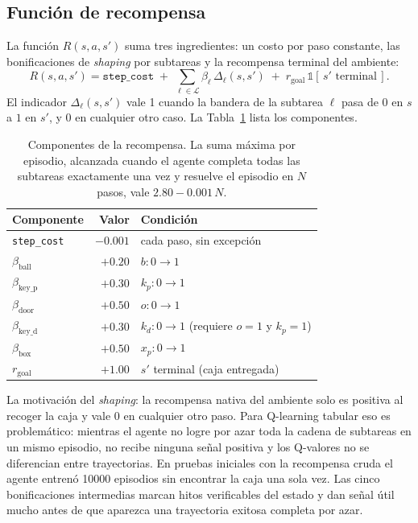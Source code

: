 \documentclass[11pt,a4paper]{article}
\begin{document}
\subsection{Función de recompensa}
\label{sec:recompensa}

La función \(R(s, a, s')\) suma tres ingredientes: un costo por paso
constante, las bonificaciones de \emph{shaping} por subtareas y la
recompensa terminal del ambiente:
\begin{equation}
  R(s, a, s') = \texttt{step\_cost} \;+\; \sum_{\ell\in\mathcal{L}} \beta_\ell\, \Delta_\ell(s, s') \;+\; r_{\text{goal}}\,\mathbb{1}\!\left[\,s' \text{ terminal}\,\right].
  \label{eq:reward}
\end{equation}
El indicador \(\Delta_\ell(s, s')\) vale 1 cuando la bandera de la
subtarea \(\ell\) pasa de \(0\) en \(s\) a \(1\) en \(s'\), y \(0\) en
cualquier otro caso. La Tabla~\ref{tab:rewards} lista los componentes.

\begin{table}[h]
  \centering
  \small
  \setlength{\extrarowheight}{2pt}
  \begin{tabular}{l r l}
    \toprule
    \textbf{Componente} & \textbf{Valor} & \textbf{Condición} \\
    \midrule
    \texttt{step\_cost}        & \(-0.001\) & cada paso, sin excepción \\
    \(\beta_{\text{ball}}\)    & \(+0.20\)  & \(b: 0\to 1\) \\
    \(\beta_{\text{key\_p}}\)  & \(+0.30\)  & \(k_p: 0\to 1\) \\
    \(\beta_{\text{door}}\)    & \(+0.50\)  & \(o: 0\to 1\) \\
    \(\beta_{\text{key\_d}}\)  & \(+0.30\)  & \(k_d: 0\to 1\) (requiere \(o=1\) y \(k_p=1\)) \\
    \(\beta_{\text{box}}\)     & \(+0.50\)  & \(x_p: 0\to 1\) \\
    \(r_{\text{goal}}\)        & \(+1.00\)  & \(s'\) terminal (caja entregada) \\
    \bottomrule
  \end{tabular}
  \caption{Componentes de la recompensa. La suma máxima por episodio,
  alcanzada cuando el agente completa todas las subtareas exactamente
  una vez y resuelve el episodio en \(N\) pasos, vale
  \(2.80 - 0.001\,N\).}
  \label{tab:rewards}
\end{table}

La motivación del \emph{shaping}: la recompensa nativa del ambiente
solo es positiva al recoger la caja y vale \(0\) en cualquier otro
paso. Para Q-learning tabular eso es problemático: mientras el agente
no logre por azar toda la cadena de subtareas en un mismo episodio, no
recibe ninguna señal positiva y los Q-valores no se diferencian entre
trayectorias. En pruebas iniciales con la recompensa cruda el agente
entrenó \num{10000} episodios sin encontrar la caja una sola vez. Las
cinco bonificaciones intermedias marcan hitos verificables del estado
y dan señal útil mucho antes de que aparezca una trayectoria exitosa
completa por azar.
\end{document}
